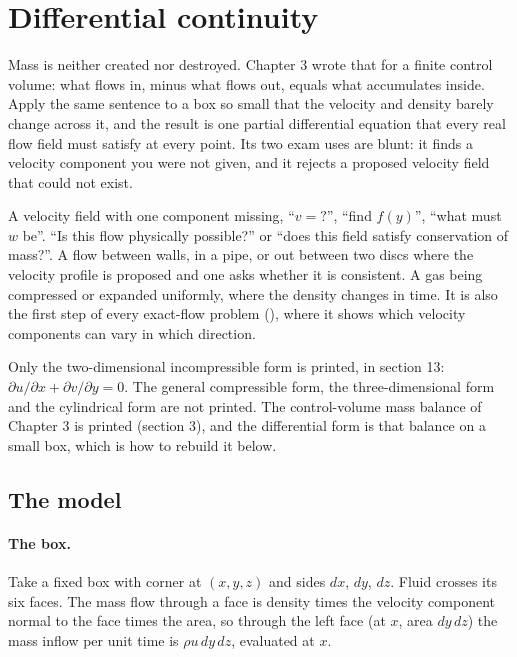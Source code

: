 \section{Differential continuity}
\label{sec:continuity}

Mass is neither created nor destroyed. Chapter 3 wrote that for a finite control volume: what flows in, minus what flows out, equals what accumulates inside. Apply the same sentence to a box so small that the velocity and density barely change across it, and the result is one partial differential equation that every real flow field must satisfy at every point. Its two exam uses are blunt: it finds a velocity component you were not given, and it rejects a proposed velocity field that could not exist.

\begin{recognise}
A velocity field with one component missing, ``$v = ?$'', ``find $f(y)$'', ``what must $w$ be''. ``Is this flow physically possible?'' or ``does this field satisfy conservation of mass?''. A flow between walls, in a pipe, or out between two discs where the velocity profile is proposed and one asks whether it is consistent. A gas being compressed or expanded uniformly, where the density changes in time. It is also the first step of every exact-flow problem (), where it shows which velocity components can vary in which direction.
\end{recognise}

\begin{onsheet}
Only the two-dimensional incompressible form is printed, in section 13: $\partial u/\partial x + \partial v/\partial y = 0$. The general compressible form, the three-dimensional form and the cylindrical form are not printed. The control-volume mass balance of Chapter 3 is printed (section 3), and the differential form is that balance on a small box, which is how to rebuild it below.
\end{onsheet}

\subsection*{The model}

\paragraph{The box.} Take a fixed box with corner at $(x,y,z)$ and sides $dx$, $dy$, $dz$. Fluid crosses its six faces. The mass flow through a face is density times the velocity component normal to the face times the area, so through the left face (at $x$, area $dy\,dz$) the mass inflow per unit time is $\rho u\,dy\,dz$, evaluated at $x$.

